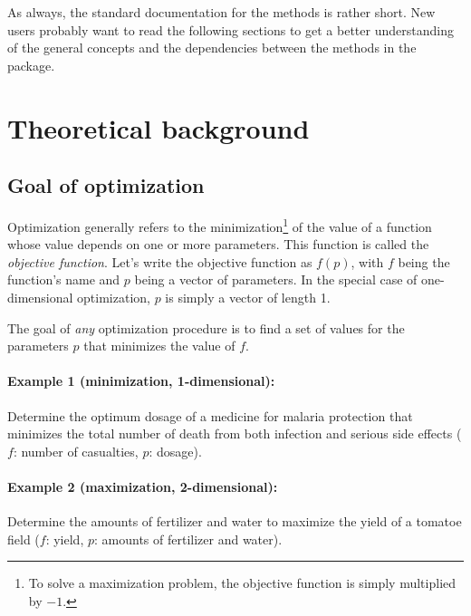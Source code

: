 As always, the standard documentation for the methods is rather short. New users probably want to read the following sections to get a better understanding of the general concepts and the dependencies between the methods in the  package.

\section{Theoretical background} \label{sec:mops:background}

\subsection{Goal of optimization} \label{sec:mops:background:optimization:goal}

Optimization generally refers to the minimization\footnote{To solve a maximization problem, the objective function is simply multiplied by $-1$.} of the value of a function whose value depends on one or more parameters. This function is called the \emph{objective function}. Let's write the objective function as $f(p)$, with $f$ being the function's name and $p$ being a vector of parameters. In the special case of one-dimensional optimization, $p$ is simply a vector of length 1.

The goal of \emph{any} optimization procedure is to find a set of values for the parameters $p$ that minimizes the value of $f$.

\paragraph{Example 1 (minimization, 1-dimensional):} Determine the optimum dosage of a medicine for malaria protection that minimizes the total number of death from both infection and serious side effects ($f$: number of casualties, $p$: dosage).

\paragraph{Example 2 (maximization, 2-dimensional):} Determine the amounts of fertilizer and water to maximize the yield of a tomatoe field ($f$: yield, $p$: amounts of fertilizer and water).

